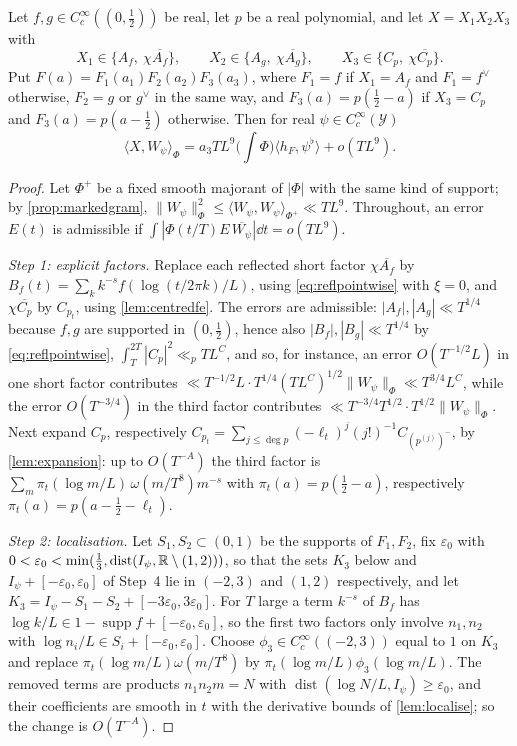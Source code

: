 \documentclass[11pt,colorlinks]{charlie}
\newcommand{\ip}[2]{\langle #1,#2\rangle}
\begin{document}
\begin{lemma}\label{lem:factors}
Let $f,g\in C_c^\infty((0,\frac12))$ be real, let $p$ be a real polynomial, and let $X=X_1X_2X_3$ with
\[
 X_1\in\{A_f,\ \chi\overline{A_f}\},\qquad X_2\in\{A_g,\ \chi\overline{A_g}\},\qquad X_3\in\{C_p,\ \chi\overline{C_p}\}.
\]
Put $F(a)=F_1(a_1)F_2(a_2)F_3(a_3)$, where $F_1=f$ if $X_1=A_f$ and $F_1=f^\vee$ otherwise, $F_2=g$ or $g^\vee$ in the same way, and $F_3(a)=p(\frac12-a)$ if $X_3=C_p$ and $F_3(a)=p(a-\frac12)$ otherwise. Then for real $\psi\in C_c^\infty(\mathcal Y)$
\[
 \ip X{W_\psi}_\Phi=a_3TL^9\Big(\int\Phi\Big)\ip{h_F}{\psi^\flat}+o(TL^9).
\]
\end{lemma}
\begin{proof}
Let $\Phi^+$ be a fixed smooth majorant of $|\Phi|$ with the same kind of support; by \cref{prop:markedgram}, $\|W_\psi\|_\Phi^2\le\ip{W_\psi}{W_\psi}_{\Phi^+}\ll TL^9$. Throughout, an error $E(t)$ is admissible if $\int|\Phi(t/T)E\,\overline{W_\psi}|\dd t=o(TL^9)$.

\emph{Step 1: explicit factors.} Replace each reflected short factor $\chi\overline{A_f}$ by $B_f(t)=\sum_kk^{-s}f(\log(t/2\pi k)/L)$, using \eqref{eq:reflpointwise} with $\xi=0$, and $\chi\overline{C_p}$ by $C_{p_t}$, using \cref{lem:centredfe}. The errors are admissible: $|A_f|,|A_g|\ll T^{1/4}$ because $f,g$ are supported in $(0,\frac12)$, hence also $|B_f|,|B_g|\ll T^{1/4}$ by \eqref{eq:reflpointwise}, $\int_T^{2T}|C_p|^2\ll_pTL^C$, and so, for instance, an error $O(T^{-1/2}L)$ in one short factor contributes $\ll T^{-1/2}L\cdot T^{1/4}(TL^C)^{1/2}\|W_\psi\|_\Phi\ll T^{3/4}L^C$, while the error $O(T^{-3/4})$ in the third factor contributes $\ll T^{-3/4}T^{1/2}\cdot T^{1/2}\|W_\psi\|_\Phi$. Next expand $C_p$, respectively $C_{p_t}=\sum_{j\le\deg p}(-\ell_t)^j(j!)^{-1}C_{(p^{(j)})^-}$, by \cref{lem:expansion}: up to $O(T^{-A})$ the third factor is $\sum_m\pi_t(\log m/L)\,\omega(m/T^8)m^{-s}$ with $\pi_t(a)=p(\frac12-a)$, respectively $\pi_t(a)=p(a-\frac12-\ell_t)$.

\emph{Step 2: localisation.} Let $S_1,S_2\subset(0,1)$ be the supports of $F_1,F_2$, fix $\varepsilon_0$ with $0<\varepsilon_0<\min(\frac13,\operatorname{dist}(I_\psi,\mathbb{R}\setminus(1,2)))$, so that the sets $K_3$ below and $I_\psi+[-\varepsilon_0,\varepsilon_0]$ of Step~4 lie in $(-2,3)$ and $(1,2)$ respectively, and let $K_3=I_\psi-S_1-S_2+[-3\varepsilon_0,3\varepsilon_0]$. For $T$ large a term $k^{-s}$ of $B_f$ has $\log k/L\in1-\operatorname{supp}f+[-\varepsilon_0,\varepsilon_0]$, so the first two factors only involve $n_1,n_2$ with $\log n_i/L\in S_i+[-\varepsilon_0,\varepsilon_0]$. Choose $\phi_3\in C_c^\infty((-2,3))$ equal to $1$ on $K_3$ and replace $\pi_t(\log m/L)\omega(m/T^8)$ by $\pi_t(\log m/L)\phi_3(\log m/L)$. The removed terms are products $n_1n_2m=N$ with $\operatorname{dist}(\log N/L,I_\psi)\ge\varepsilon_0$, and their coefficients are smooth in $t$ with the derivative bounds of \cref{lem:localise}; so the change is $O(T^{-A})$.


\end{proof}
\end{document}
